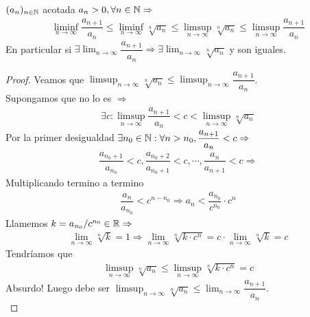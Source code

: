 \begin{theorem}
  \((a_n)_{n \in \mathbb{N}}\) acotada \(a_n > 0, \forall n \in \mathbb{N} \Rightarrow\) \begin{align*}
    \liminf_{n \to \infty} \dfrac{a_{n+1}}{a_n} \leq \liminf_{n \to \infty} \sqrt[n]{a_n} \leq \limsup_{n \to \infty} \sqrt[n]{a_n} \leq \limsup_{n \to \infty} \dfrac{a_{n+1}}{a_n}
  \end{align*}
  En particular si \(\exists \lim_{n \to \infty} \dfrac{a_{n+1}}{a_n} \Rightarrow \exists \lim_{n \to \infty} \sqrt[n]{a_n}\) y son iguales.

  \begin{proof}
    Veamos que \(\limsup_{n \to \infty} \sqrt[n]{a_n} \leq \limsup_{n \to \infty} \dfrac{a_{n+1}}{a_n}\). \\
    Supongamos que no lo es \(\Rightarrow\)
    \begin{align*}
      \exists c : \limsup_{n \to \infty} \dfrac{a_{n+1}}{a_n} < c < \limsup_{n \to \infty} \sqrt[n]{a_n}
    \end{align*} Por la primer desigualdad \(\exists n_0 \in \mathbb{N} : \forall n > n_0, \dfrac{a_{n+1}}{a_n} < c \Rightarrow\) \begin{align*}
      \dfrac{a_{n_0+1}}{a_{n_0}} < c, \dfrac{a_{n_0+2}}{a_{n_0+1}} < c, \cdots, \dfrac{a_n}{a_{n+1}} < c \Rightarrow
    \end{align*}
    Multiplicando termino a termino
    \begin{align*}
      \dfrac{a_n}{a_{n_0}} < c^{n - n_0} \Rightarrow a_n < \dfrac{a_{n_0}}{c^{n_0}} \cdot c^n
    \end{align*} Llamemos \(k = a_{n_0}/c^{n_0} \in \mathbb{R} \Rightarrow\) \begin{align*}
      \lim_{n \to \infty} \sqrt[n]{k} = 1 \Rightarrow \lim_{n \to \infty} \sqrt[n]{k \cdot c^n} = c \cdot \lim_{n \to \infty} \sqrt[n]{k} = c
    \end{align*} Tendríamos que \begin{align*}
      \limsup_{n \to \infty} \sqrt[n]{a_n} \leq \limsup_{n \to \infty} \sqrt[n]{k \cdot c^n} = c
    \end{align*} Absurdo!
    Luego debe ser \(\limsup_{n \to \infty} \sqrt[n]{a_n} \leq \lim_{n \to \infty} \dfrac{a_{n+1}}{a_n}\). \\
  \end{proof}
\end{theorem}

\clearpage

